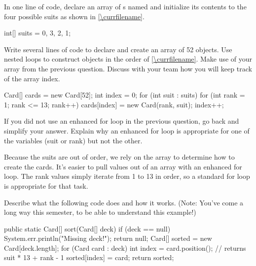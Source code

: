 \begin{javalst}
}
\end{javalst}


\Q In one line of code, declare an array of s named  and initialize its contents to the four possible suits as shown in \ref{\currfilename}.


\vspace*{-1ex}
\begin{answer}[3em]
\begin{javaans}
    int[] suits = {0, 3, 2, 1};
\end{javaans}
\end{answer}


\Q \label{build}
Write several lines of code to declare and create an array of 52  objects.
Use nested  loops to construct  objects in the order of \ref{\currfilename}.
Make use of your  array from the previous question.
Discuss with your team how you will keep track of the array index.

\vspace*{-1ex}
\begin{answer}[11em]
\begin{javaans}
Card[] cards = new Card[52];
int index = 0;
for (int suit : suits) {
    for (int rank = 1; rank <= 13; rank++) {
        cards[index] = new Card(rank, suit);
        index++;
    }
}
\end{javaans}
\end{answer}


\Q If you did not use an enhanced for loop in the previous question, go back and simplify your answer.
Explain why an enhanced for loop is appropriate for one of the variables (suit or rank) but not the other.

\begin{answer}[5em]
Because the suits are out of order, we rely on the  array to determine how to create the cards.
It's easier to pull values out of an array with an enhanced for loop.
The rank values simply iterate from 1 to 13 in order, so a standard for loop is appropriate for that task.
\end{answer}


\Q Describe what the following code does and how it works. (Note: You've come a long way this semester, to be able to understand this example!)

\begin{javalst}
public static Card[] sort(Card[] deck) {
    if (deck == null) {
        System.err.println("Missing deck!");
        return null;
    }
    Card[] sorted = new Card[deck.length];
    for (Card card : deck) {
        int index = card.position();       // returns suit * 13 + rank - 1
        sorted[index] = card;
    }
    return sorted;
}
\end{javalst}

